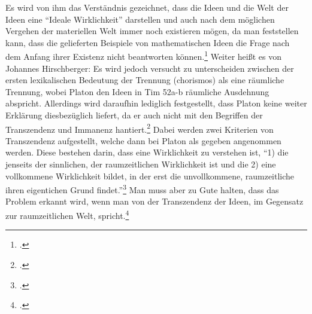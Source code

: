 
Es wird von ihm das Verständnis gezeichnet, dass die Ideen und die Welt der Ideen eine \enquote{Ideale Wirklichkeit} darstellen und auch nach dem möglichen Vergehen der materiellen Welt immer noch existieren mögen, da man feststellen kann, dass die gelieferten Beispiele von mathematischen Ideen die Frage nach dem Anfang ihrer Existenz nicht beantworten können.\footcite[vgl.][S. 99]{Hirschberger} 
Weiter heißt es von Johannes Hirschberger:
Es wird jedoch versucht zu unterscheiden zwischen der ersten lexikalischen Bedeutung der Trennung (chorismos) als eine räumliche Trennung, wobei Platon den Ideen in Tim 52a-b räumliche Ausdehnung abspricht. Allerdings wird daraufhin lediglich festgestellt, dass Platon keine weiter Erklärung diesbezüglich liefert, da er auch nicht mit den Begriffen der Transzendenz und Immanenz hantiert.\footcite[vgl.][S. 34f]{DisseMetaphysik} Dabei werden zwei Kriterien von Transzendenz aufgestellt, welche dann bei Platon als gegeben angenommen werden. Diese bestehen darin, dass eine Wirklichkeit zu verstehen ist, \enquote{1) die jenseits der sinnlichen, der raumzeitlichen Wirklichkeit ist und die 2) eine vollkommene Wirklichkeit bildet, in der erst die unvollkommene, raumzeitliche ihren eigentichen Grund findet.}\footcite[][S. 35]{DisseMetaphysik} Man muss aber zu Gute halten, dass das Problem erkannt wird, wenn man von der Transzendenz der Ideen, im Gegensatz zur raumzeitlichen Welt, spricht.\footcite[vgl.][S. 35]{DisseMetaphysik} 
